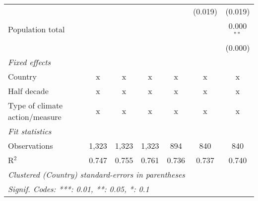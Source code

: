 \begin{tabular}{lcccccc}
                                                                                         &                &                &                &                & (0.019)        & (0.019)\\   
   Population total                                                                      &                &                &                &                &                & 0.000$^{**}$\\   
                                                                                         &                &                &                &                &                & (0.000)\\   
   \emph{Fixed effects}\\
   Country                                                                               & x              & x              & x              & x              & x              & x\\  
   Half decade                                                                           & x              & x              & x              & x              & x              & x\\  
   Type of climate action/measure                                                        & x              & x              & x              & x              & x              & x\\  
   \midrule \emph{Fit statistics}\\
   Observations                                                                          & 1,323          & 1,323          & 1,323          & 894            & 840            & 840\\  
   R$^2$                                                                                 & 0.747          & 0.755          & 0.761          & 0.736          & 0.737          & 0.740\\  
   \midrule
   \multicolumn{7}{l}{\emph{Clustered (Country) standard-errors in parentheses}}\\
   \multicolumn{7}{l}{\emph{Signif. Codes: ***: 0.01, **: 0.05, *: 0.1}}\\
\end{tabular}
\par\endgroup


